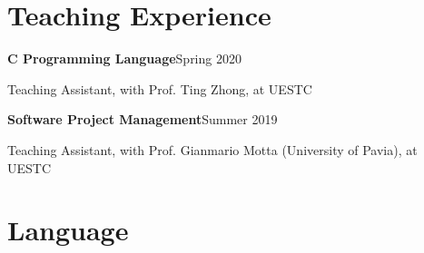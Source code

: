 \documentclass{article}
\begin{document}






\section*{Teaching Experience}
\indent


\textbf{C Programming Language}\hfill Spring 2020

\hspace{2em}Teaching Assistant, with Prof. Ting Zhong, at UESTC

\textbf{Software Project Management}\hfill Summer 2019

\hspace{2em}Teaching Assistant, with Prof. Gianmario Motta (University of Pavia), at UESTC







\section*{Language}
\indent
\end{document}
